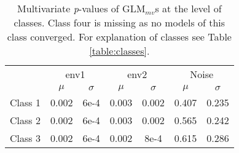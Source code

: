 		\begin{table*}[h!] 
			\small
			\caption{Multivariate \textit{p}-values of GLM$_{mv}$s at the level of classes. Class four is missing as no models of this class converged. For explanation of classes see Table \ref{table:classes}.}
			\centering
			\begin{tabular}{@{}lcccccc@{}}
				
				\toprule
				& \multicolumn{2}{c}{env1} & \multicolumn{2}{c}{env2} & \multicolumn{2}{c}{Noise}\\ \cmidrule(l){2-3} \cmidrule(l){4-5} \cmidrule(l){6-7}
				& $\mu$ & $\sigma$ & $\mu$ & $\sigma$ & $\mu$ & $\sigma$\\
				\hline
				Class 1 & 0.002 & 6e-4 & 0.003 & 0.002 & 0.407 & 0.235\\
				Class 2 & 0.002 & 6e-4 & 0.003 & 0.002 & 0.565 & 0.242\\
				Class 3 & 0.002 & 6e-4 & 0.002 & 8e-4  & 0.615 & 0.286\\
				\toprule
			\end{tabular}
			
			\label{tab:SMGLM1}
			
		\end{table*}
		
